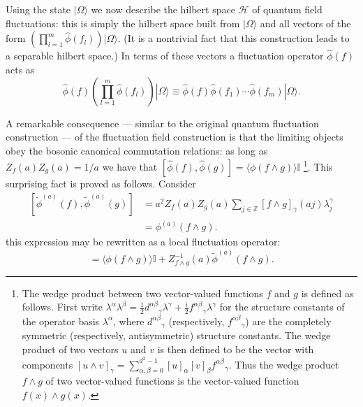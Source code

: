\documentclass[prl,twocolumn,lengthcheck,superscriptaddress]{revtex4-1}
\theoremstyle{definition}
\theoremstyle{remark}
\begin{document}
Using the state $|\Omega\rangle$ we now describe the hilbert space $\mathcal{H}$ of quantum field fluctuations: this is simply the hilbert space built from $|\Omega\rangle$ and all vectors of the form $\left(\prod_{l=1}^m\widehat{\phi}(f_l)\right)|\Omega\rangle$. (It is a nontrivial fact that this construction leads to a separable hilbert space.) In terms of these vectors a fluctuation operator $\widehat{\phi}(f)$ acts as
\begin{equation}	
	\widehat{\phi}(f) \left(\prod_{l=1}^m\widehat{\phi}(f_l)\right)|\Omega\rangle \equiv \widehat{\phi}(f) \widehat{\phi}(f_1)\cdots \widehat{\phi}(f_m)|\Omega\rangle.
\end{equation}

A remarkable consequence --- similar to the original quantum fluctuation construction \cite{hepp:1973b, verbeure:2011a} --- of the fluctuation field construction is that the limiting objects obey the bosonic canonical commutation relations: as long as $Z_f(a)Z_g(a) = 1/a$ we have that $[\widehat{\phi}(f), \widehat{\phi}(g)] = \langle \phi(f\wedge g)\rangle \mathbb{I}$ \footnote{The wedge product between two vector-valued functions $f$ and $g$ is defined as follows. First write $\lambda^\alpha\lambda^\beta =  \frac12{d^{\alpha\beta}}_\gamma \lambda^\gamma + \frac{i}{2}{f^{\alpha\beta}}_{\gamma}\lambda^\gamma$ for the structure constants of the operator basis $\lambda^\alpha$, where ${d^{\alpha\beta}}_\gamma$ (respectively, ${f^{\alpha\beta}}_{\gamma}$) are the completely symmetric (respectively, antisymmetric) structure constants. The wedge product of two vectors $u$ and $v$  is then defined to be the vector with components $[u\wedge v]_{\gamma} = \sum_{\alpha,\beta=0}^{d^2 -1}[u]_\alpha[v]_\beta {f^{\alpha\beta}}_\gamma$. Thus the wedge product $f\wedge g$ of two vector-valued functions is the vector-valued function $f(x)\wedge g(x)$.}. This surprising fact is proved as follows.  Consider
\begin{equation}
	\begin{split}
		[\widetilde{\phi}^{(a)}(f), \widetilde{\phi}^{(a)}(g)] &= a^2Z_f(a)Z_g(a)\sum_{j\in\mathbb{Z}} [f\wedge g]_\gamma(aj) \lambda^\gamma_j \\
		&= \phi^{(a)}(f\wedge g).
	\end{split}
\end{equation} 
this expression may be rewritten as a local fluctuation operator:
\begin{equation}
	[\widetilde{\phi}^{(a)}(f), \widetilde{\phi}^{(a)}(g)] = \langle\phi(f\wedge g)\rangle \mathbb{I} + Z_{f\wedge g}^{-1}(a)\widetilde{\phi}^{(a)}(f\wedge g).
\end{equation}
\end{document}
